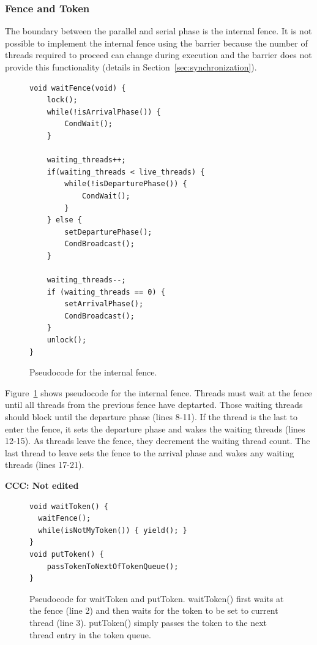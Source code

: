 \subsubsection{Fence and Token}
\label{sec:schedule}

The boundary between the parallel and serial phase is the internal fence.  
It is not possible to implement the internal fence using the \pthreads{} barrier 
because the number of threads required to proceed can change during execution and the \pthreads{} barrier does not provide this functionality (details in Section~\ref{sec:synchronization}).

\label{sec:token}
\begin{figure}
\begin{lstlisting}
void waitFence(void) {
	lock();
	while(!isArrivalPhase()) { 
		CondWait();
	}

	waiting_threads++;
	if(waiting_threads < live_threads) {
		while(!isDeparturePhase()) {
			CondWait();
		}
	} else {
		setDeparturePhase();
		CondBroadcast();
	}

	waiting_threads--;
	if (waiting_threads == 0) {
		setArrivalPhase();
		CondBroadcast();
	}
	unlock();
}
\end{lstlisting}
\caption{Pseudocode for the internal fence.\label{fig:internalFence}}
\end{figure}

Figure~\ref{fig:internalFence} shows pseudocode for the internal fence.  Threads must wait at the fence 
until all threads from the previous 
fence have deptarted. Those waiting threads should block until the departure phase (lines 8-11). 
If the thread is the last to enter the fence, it sets the departure phase and wakes the waiting threads (lines 12-15).  
As threads leave the fence, they decrement the waiting thread count.  The last thread to leave sets the fence to the arrival phase and wakes any waiting threads (lines 17-21).

\textbf{CCC: Not edited}

\begin{figure}
\begin{lstlisting}
void waitToken() {
  waitFence();
  while(isNotMyToken()) { yield(); }
}
void putToken() {
    passTokenToNextOfTokenQueue();
}
\end{lstlisting}
\caption{Pseudocode for waitToken and putToken. waitToken() first waits at the fence (line 2) and then waits for
the token to be set to current thread (line 3).  putToken() simply
passes the token to the next thread entry in the token queue.
\label{fig:token}}
\end{figure}

